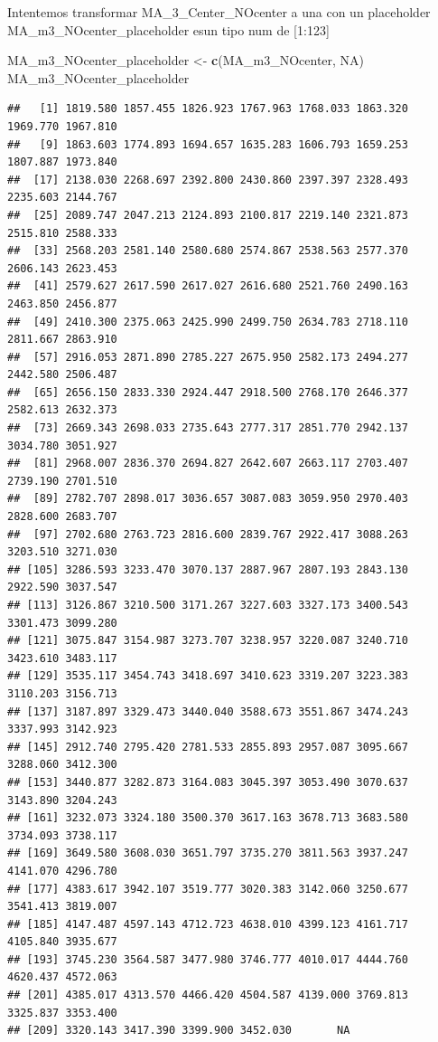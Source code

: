 \documentclass[
]{article}
\newenvironment{Shaded}{\begin{snugshade}}{\end{snugshade}}
\newcommand{\ConstantTok}[1]{\textcolor[rgb]{0.56,0.35,0.01}{#1}}
\newcommand{\FunctionTok}[1]{\textcolor[rgb]{0.13,0.29,0.53}{\textbf{#1}}}
\newcommand{\NormalTok}[1]{#1}
\newcommand{\OtherTok}[1]{\textcolor[rgb]{0.56,0.35,0.01}{#1}}
\begin{document}
Intentemos transformar MA\_3\_Center\_NOcenter a una con un placeholder
MA\_m3\_NOcenter\_placeholder esun tipo num de {[}1:123{]}

\begin{Shaded}
\begin{Highlighting}[]
\NormalTok{MA\_m3\_NOcenter\_placeholder }\OtherTok{\textless{}{-}} \FunctionTok{c}\NormalTok{(MA\_m3\_NOcenter, }\ConstantTok{NA}\NormalTok{)}
\NormalTok{MA\_m3\_NOcenter\_placeholder}
\end{Highlighting}
\end{Shaded}

\begin{verbatim}
##   [1] 1819.580 1857.455 1826.923 1767.963 1768.033 1863.320 1969.770 1967.810
##   [9] 1863.603 1774.893 1694.657 1635.283 1606.793 1659.253 1807.887 1973.840
##  [17] 2138.030 2268.697 2392.800 2430.860 2397.397 2328.493 2235.603 2144.767
##  [25] 2089.747 2047.213 2124.893 2100.817 2219.140 2321.873 2515.810 2588.333
##  [33] 2568.203 2581.140 2580.680 2574.867 2538.563 2577.370 2606.143 2623.453
##  [41] 2579.627 2617.590 2617.027 2616.680 2521.760 2490.163 2463.850 2456.877
##  [49] 2410.300 2375.063 2425.990 2499.750 2634.783 2718.110 2811.667 2863.910
##  [57] 2916.053 2871.890 2785.227 2675.950 2582.173 2494.277 2442.580 2506.487
##  [65] 2656.150 2833.330 2924.447 2918.500 2768.170 2646.377 2582.613 2632.373
##  [73] 2669.343 2698.033 2735.643 2777.317 2851.770 2942.137 3034.780 3051.927
##  [81] 2968.007 2836.370 2694.827 2642.607 2663.117 2703.407 2739.190 2701.510
##  [89] 2782.707 2898.017 3036.657 3087.083 3059.950 2970.403 2828.600 2683.707
##  [97] 2702.680 2763.723 2816.600 2839.767 2922.417 3088.263 3203.510 3271.030
## [105] 3286.593 3233.470 3070.137 2887.967 2807.193 2843.130 2922.590 3037.547
## [113] 3126.867 3210.500 3171.267 3227.603 3327.173 3400.543 3301.473 3099.280
## [121] 3075.847 3154.987 3273.707 3238.957 3220.087 3240.710 3423.610 3483.117
## [129] 3535.117 3454.743 3418.697 3410.623 3319.207 3223.383 3110.203 3156.713
## [137] 3187.897 3329.473 3440.040 3588.673 3551.867 3474.243 3337.993 3142.923
## [145] 2912.740 2795.420 2781.533 2855.893 2957.087 3095.667 3288.060 3412.300
## [153] 3440.877 3282.873 3164.083 3045.397 3053.490 3070.637 3143.890 3204.243
## [161] 3232.073 3324.180 3500.370 3617.163 3678.713 3683.580 3734.093 3738.117
## [169] 3649.580 3608.030 3651.797 3735.270 3811.563 3937.247 4141.070 4296.780
## [177] 4383.617 3942.107 3519.777 3020.383 3142.060 3250.677 3541.413 3819.007
## [185] 4147.487 4597.143 4712.723 4638.010 4399.123 4161.717 4105.840 3935.677
## [193] 3745.230 3564.587 3477.980 3746.777 4010.017 4444.760 4620.437 4572.063
## [201] 4385.017 4313.570 4466.420 4504.587 4139.000 3769.813 3325.837 3353.400
## [209] 3320.143 3417.390 3399.900 3452.030       NA
\end{verbatim}
\end{document}
